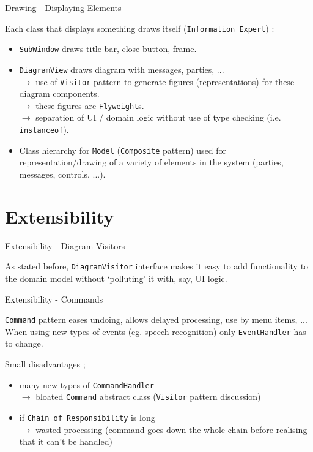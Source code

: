 \documentclass[10pt]{beamer}
\begin{document}
\begin{frame}[fragile]{Drawing - Displaying Elements}
	\begin{center}
	Each class that displays something draws itself (\texttt{Information Expert}) :
	\begin{itemize}
	\item \texttt{SubWindow} draws title bar, close button, frame.
	\item \texttt{DiagramView} draws diagram with messages, parties, ...
	\\$\rightarrow$ use of \texttt{Visitor} pattern to generate figures (representations) for these diagram components.
	\\$\rightarrow$ these figures are \texttt{Flyweight}s.
	\\$\rightarrow$ separation of UI / domain logic without use of type checking (i.e. \texttt{instanceof}).
	\item Class hierarchy for \texttt{Model} (\texttt{Composite} pattern) used for representation/drawing of a variety of elements in the system (parties, messages, controls, ...).
	\end{itemize}
	\end{center}
\end{frame}

\section{Extensibility}

\begin{frame}[fragile]{Extensibility - Diagram Visitors}
	\begin{center}
		As stated before, \texttt{DiagramVisitor} interface makes it easy to add functionality to the domain model without `polluting' it with, say, UI logic.
	\end{center}
\end{frame}

\begin{frame}[fragile]{Extensibility - Commands}
	\begin{center}
	\texttt{Command} pattern eases undoing, allows delayed processing, use by menu items, ... When using new types of events (eg. speech recognition) only \texttt{EventHandler} has to change.
	
	\vspace{0.5cm} Small disadvantages ; 
	\begin{itemize}
	\item many new types of \texttt{CommandHandler} 
	\\ $\rightarrow$ bloated \texttt{Command} abstract class (\texttt{Visitor} pattern discussion)
	\item if \texttt{Chain of Responsibility} is long
	\\ $\rightarrow$ wasted processing (command goes down the whole chain before realising that it can't be handled)
	\end{itemize}
	\end{center}
\end{frame}
\end{document}
